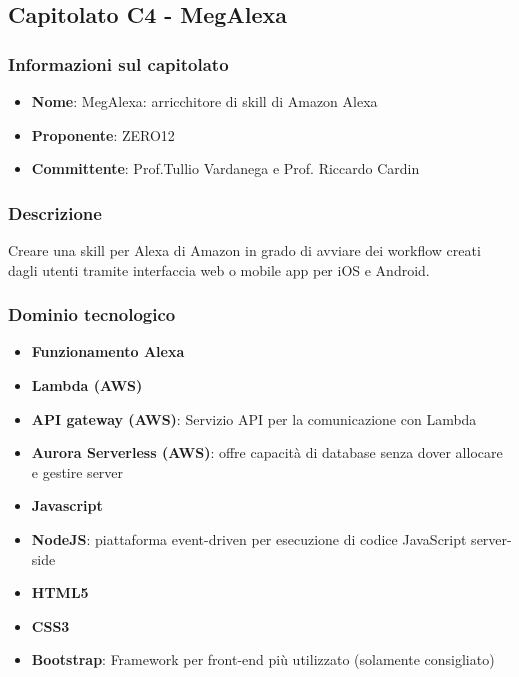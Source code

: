 \subsection{Capitolato C4 - MegAlexa}
\subsubsection{Informazioni sul capitolato}
\begin{itemize}
    \item \textbf{Nome}: MegAlexa: arricchitore di skill di Amazon Alexa
	\item \textbf{Proponente}: ZERO12
	\item \textbf{Committente}: Prof.Tullio Vardanega e Prof. Riccardo Cardin
\end{itemize}
\subsubsection{Descrizione}
Creare una skill per Alexa di Amazon in grado di avviare dei workflow creati dagli utenti tramite interfaccia web o
mobile app per iOS e Android.
\subsubsection{Dominio tecnologico}
\begin{itemize}
    \item \textbf{Funzionamento Alexa}
    \item \textbf{Lambda (AWS)}
    \item \textbf{API gateway (AWS)}: Servizio API per la comunicazione con Lambda
    \item \textbf{Aurora Serverless (AWS)}: offre capacità di database senza dover allocare e gestire server
    \item \textbf{Javascript}
    \item \textbf{NodeJS}: piattaforma event-driven per esecuzione di codice JavaScript server-side
    \item \textbf{HTML5}
    \item \textbf{CSS3}
    \item \textbf{Bootstrap}: Framework per front-end più utilizzato (solamente consigliato)
\end{itemize}
